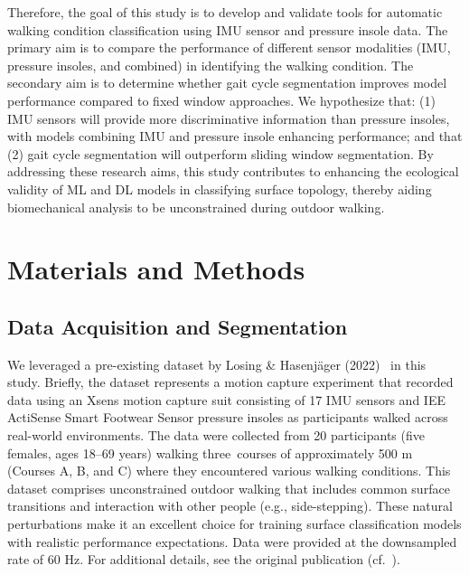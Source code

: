 \documentclass[sensors,article,accept,pdftex,moreauthors]{Definitions/mdpi}
\begin{document}
Therefore, the goal of this study is to develop and validate tools for automatic walking condition classification using IMU sensor and pressure \textcolor{revision}{insole} data. The primary aim is to compare the performance of different sensor modalities (IMU, pressure insoles, and combined) in identifying the walking condition. The secondary aim is to determine whether gait cycle segmentation improves model performance compared to fixed window approaches. We hypothesize that: (1) IMU sensors will provide more discriminative information than pressure insoles, with models combining IMU and pressure insole enhancing performance; and that (2) gait cycle segmentation will outperform sliding window segmentation. By addressing these research aims, this study contributes to enhancing the ecological validity of ML and DL models in classifying surface topology, thereby aiding biomechanical analysis to be unconstrained during outdoor walking.




\section{Materials and Methods}
\label{sec:Methods}

\subsection{Data Acquisition and Segmentation}
We leveraged a pre-existing dataset by Losing \& Hasenj{\"a}ger (2022)~\cite{losing_2022} in this study. Briefly, the dataset represents a motion capture experiment that recorded data using an Xsens motion capture suit consisting of 17 IMU sensors \cite{xsens} and IEE ActiSense Smart Footwear Sensor pressure insoles \cite{foot_pressure} as participants walked across real-world environments. The data were collected from 20 participants (five females, ages 18--69 years) walking \mbox{three courses} of approximately 500 m (Courses A, B, and C) where they encountered various walking conditions. {This dataset comprises unconstrained outdoor walking that includes common surface transitions and interaction with other people (e.g., side-stepping). These natural perturbations make it an excellent choice for training surface classification models with realistic performance expectations.} Data were provided at the downsampled rate of 60 Hz. For additional details, see the original publication (cf.~\cite{losing_2022}).
\end{document}
